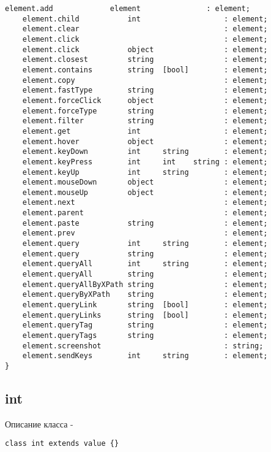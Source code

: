 \begin{lstlisting}[numbers=none]
    element.add             element               : element;
    element.child           int                   : element;
    element.clear                                 : element;
    element.click                                 : element;
    element.click           object                : element;
    element.closest         string 	              : element;
    element.contains        string 	[bool]        : element;
    element.copy                                  : element;
    element.fastType        string                : element;
    element.forceClick      object                : element;
    element.forceType       string                : element;
    element.filter          string                : element;
    element.get             int                   : element;
    element.hover           object                : element;
    element.keyDown         int     string        : element;
    element.keyPress        int     int    string : element;
    element.keyUp           int     string        : element;
    element.mouseDown       object                : element;
    element.mouseUp         object                : element;
    element.next                                  : element;
    element.parent                                : element;
    element.paste           string                : element;
    element.prev                                  : element;
    element.query           int     string        : element;
    element.query           string                : element;
    element.queryAll        int     string        : element;
    element.queryAll        string                : element;
    element.queryAllByXPath string 	              : element;
    element.queryByXPath    string 	              : element;
    element.queryLink       string 	[bool]        : element;
    element.queryLinks      string  [bool]        : element;
    element.queryTag        string                : element;
    element.queryTags       string                : element;
    element.screenshot                            : string;
    element.sendKeys        int     string        : element;
}
\end{lstlisting}

\subsection{{\color{lightblue} int}}

\noindent Описание класса \integer -
\begin{lstlisting}[numbers=none]
class int extends value {}
\end{lstlisting}

